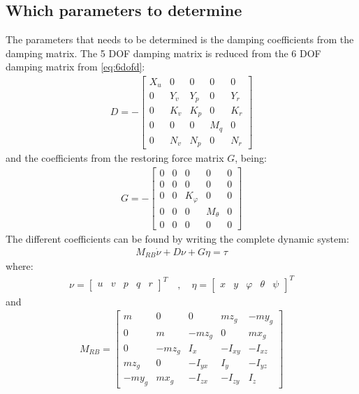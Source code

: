 \subsection{Which parameters to determine}
The parameters that needs to be determined is the damping coefficients
from the damping matrix. The 5 \ac{DOF} damping matrix is reduced from the 6 \ac{DOF} damping matrix from \ref{eq:6dofd}:
\begin{align}
D = -
\begin{bmatrix}
X_u & 0 & 0 & 0 & 0\\
0 & Y_v & Y_p & 0 & Y_r\\
0 & K_v & K_p & 0 & K_r\\
0 & 0 & 0 & M_q & 0\\
0 & N_v & N_p & 0 & N_r
\end{bmatrix}
\end{align}
and the coefficients from the restoring force matrix $G$, being:
\begin{align}
G = -
\begin{bmatrix}
0 & 0 & 0 & 0 & 0\\
0 & 0 & 0 & 0 & 0\\
0 & 0 & K_\varphi & 0 & 0\\
0 & 0 & 0 & M_\theta & 0\\
0 & 0 & 0 & 0 & 0
\end{bmatrix}
\end{align}
The different coefficients can be found by writing the complete dynamic system:
\begin{align}
M_{RB} \dot \nu + D\nu + G\eta = \tau
\end{align}
where:
\begin{align}
\nu =
\begin{bmatrix}
u & v & p & q & r
\end{bmatrix}^T
\quad , \quad
\eta =
\begin{bmatrix}
x & y & \varphi & \theta & \psi
\end{bmatrix}^T
\end{align}
and
\begin{align}
M_{RB} =
\begin{bmatrix}
m & 0 & 0 & mz_g & -my_g\\
0 & m & -mz_g & 0 & mx_g\\
0 & -mz_g & I_x & -I_{xy} & -I_{xz}\\
mz_g & 0 & -I_{yx} & I_y & -I_{yz}\\
-my_g & mx_g & -I_{zx} & -I_{zy} & I_z
\end{bmatrix}
\end{align}
